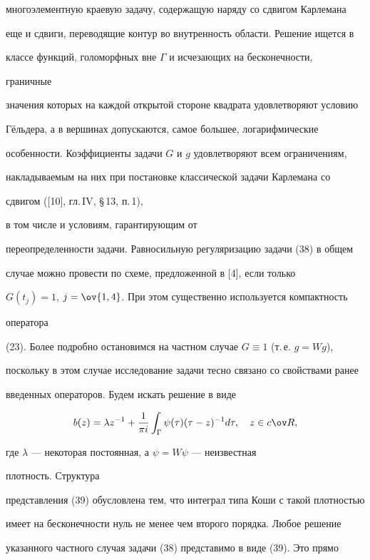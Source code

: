 многоэлементную краевую задачу, содержащую наряду со сдвигом Карлемана 


еще и сдвиги, переводящие контур во внутренность области. Решение ищется в 


классе функций, голоморфных вне $\Gamma$ и исчезающих на бесконечности, 


граничные 


значения которых на каждой открытой стороне квадрата удовлетворяют условию 


Г\"ельдера, а в вершинах допускаются, самое большее, логарифмические 


особенности. Коэффициенты задачи $G$ и $g$ удовлетворяют всем ограничениям, 


накладываемым на них при постановке классической задачи Карлемана со 


сдвигом ([10], гл.\,IV, \S\,13, п.\,1), 


в том числе и условиям, гарантирующим от 


переопределенности задачи. Равносильную регуляризацию задачи (38) в общем 


случае можно провести по схеме, предложенной в [4], если только 


$G(t_j)=1$, $j=\ov{1,4}$. При этом существенно используется компактность 


оператора 


(23). Более подробно остановимся на частном случае $G\equiv1$ (т.\,е. $g=Wg$), 


поскольку в этом случае исследование задачи тесно связано со свойствами ранее 


введенных операторов. Будем искать решение в виде 


\begin{equation} 


b(z)=\lambda z^{-1}+\frac{1}{\pi i}\int_\Gamma \psi(\tau) 


(\tau-z)^{-1}d\tau,\quad z\in c\ov R, 


\end{equation} 


где $\lambda$ --- некоторая постоянная, а $\psi=W\psi$ --- неизвестная 


плотность. Структура 


представления (39) обусловлена тем, что интеграл типа Коши с такой плотностью 


имеет на бесконечности нуль не менее чем второго порядка. Любое решение 


указанного частного случая задачи (38) представимо в виде (39). Это прямо 


